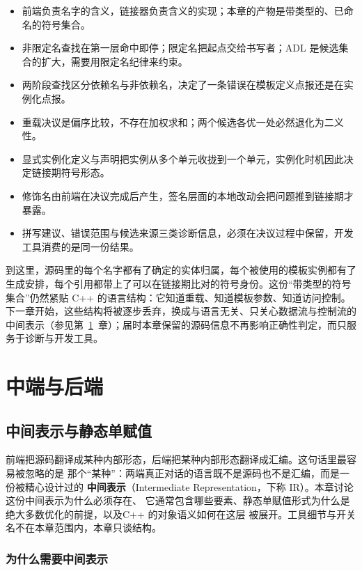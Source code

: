 \documentclass[12pt,a4paper,fontset=fandol]{ctexbook}
\newcommand{\cpp}[1]{C++#1}
\begin{document}
\begin{itemize}
  \item 前端负责名字的含义，链接器负责含义的实现；本章的产物是带类型的、已命名的符号集合。
  \item 非限定名查找在第一层命中即停；限定名把起点交给书写者；ADL 是候选集合的扩大，需要用限定名纪律来约束。
  \item 两阶段查找区分依赖名与非依赖名，决定了一条错误在模板定义点报还是在实例化点报。
  \item 重载决议是偏序比较，不存在加权求和；两个候选各优一处必然退化为二义性。
  \item 显式实例化定义与声明把实例从多个单元收拢到一个单元，实例化时机因此决定链接期符号形态。
  \item 修饰名由前端在决议完成后产生，签名层面的本地改动会把问题推到链接期才暴露。
  \item 拼写建议、错误范围与候选来源三类诊断信息，必须在决议过程中保留，开发工具消费的是同一份结果。
\end{itemize}

\begin{note}[title={本章的产物与下一章的入口}]
到这里，源码里的每个名字都有了确定的实体归属，每个被使用的模板实例都有了生成安排，每个引用都带上了可以在链接期比对的符号身份。这份“带类型的符号集合”仍然紧贴 \cpp{} 的语言结构：它知道重载、知道模板参数、知道访问控制。下一章开始，这些结构将被逐步丢弃，换成与语言无关、只关心数据流与控制流的中间表示（参见第~\ref{ch:cl04-ir}~章）；届时本章保留的源码信息不再影响正确性判定，而只服务于诊断与开发工具。
\end{note}

\part{中端与后端}
\chapter{中间表示与静态单赋值}\label{ch:cl04-ir}

前端把源码翻译成某种内部形态，后端把某种内部形态翻译成汇编。这句话里最容易被忽略的是
那个“某种”：两端真正对话的语言既不是源码也不是汇编，而是一份被精心设计过的
\textbf{中间表示}（Intermediate Representation，下称 IR）。本章讨论这份中间表示为什么必须存在、
它通常包含哪些要素、静态单赋值形式为什么是绝大多数优化的前提，以及\cpp{} 的对象语义如何在这层
被展开。工具细节与开关名不在本章范围内，本章只谈结构。

\section{为什么需要中间表示}\label{sec:cl04-why}
\end{document}
